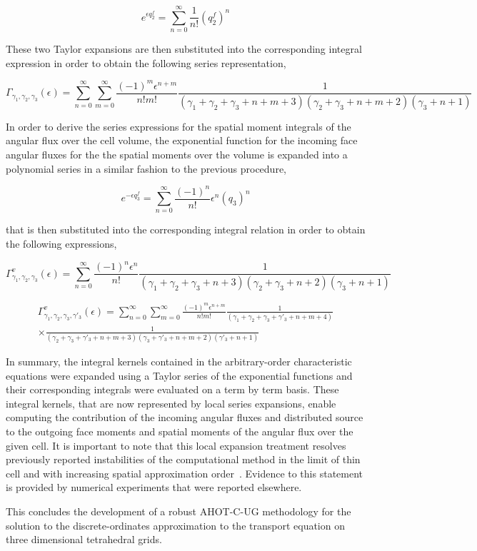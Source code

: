 \begin{equation}
    e^{\epsilon q_2^f} = \sum_{n=0}^{\infty} \frac{1}{n!} \left( q_2^f \right) ^n
\end{equation}

\noindent These two Taylor expansions are then substituted into the corresponding integral expression in order to obtain the following series representation,

\begin{equation}
    \Gamma_{\gamma_1 ,\gamma_2 ,\gamma_3} ( \epsilon ) = \sum_{n=0}^{\infty} \sum_{m=0}^{\infty} \frac{(-1)^m \epsilon^{n+m}}{n! m!}
    \frac{1}{( \gamma_1 + \gamma_2 + \gamma_3 +n+m+3) ( \gamma_2 + \gamma_3 +n+m+2) (\gamma_3 +n+1)}
\end{equation}

In order to derive the series expressions for the spatial moment integrals of the angular flux over the cell volume, the exponential function for the incoming face angular fluxes for the the spatial moments over the volume is expanded into a polynomial series in a similar fashion to the previous procedure,

\begin{equation}
    e^{- \epsilon q^f_3} = \sum_{n=0}^{\infty} \frac{(-1)^n}{n!} \epsilon^n \left( q_3 \right) ^n
\end{equation}

\noindent that is then substituted into the corresponding integral relation in order to obtain the following expressions,

\begin{equation}
    \Gamma^v_{\gamma_1 ,\gamma_2 ,\gamma_3} ( \epsilon ) = \sum_{n=0}^{\infty} \frac{(-1)^n \epsilon^{n}}{n!}
    \frac{1}{( \gamma_1 + \gamma_2 + \gamma_3 +n+3) ( \gamma_2 + \gamma_3 +n+2) (\gamma_3 +n+1)}
\end{equation}

\begin{multline}
    \Gamma^v_{\gamma_1 ,\gamma_2 ,\gamma_3 ,\gamma'_3} ( \epsilon ) = \sum_{n=0}^{\infty} \sum_{m=0}^{\infty} \frac{(-1)^m \epsilon^{n+m}}{n! m!} \frac{1}{( \gamma_1 + \gamma_2 + \gamma_3 + \gamma'_3 +n+m+4)}\\
    \times\frac{1}{( \gamma_2 + \gamma_3 + \gamma'_3 +n+m+3) ( \gamma_3 + \gamma'_3 +n+m+2) ( \gamma'_3 +n+1)}
\end{multline}

In summary, the integral kernels contained in the arbitrary-order characteristic equations were expanded using a Taylor series of the exponential functions and their corresponding integrals were evaluated on a term by term basis.
These integral kernels, that are now represented by local series expansions, enable computing the contribution of the incoming angular fluxes and distributed source to the outgoing face moments and spatial moments of the angular flux over the given cell.
It is important to note that this local expansion treatment resolves previously reported instabilities of the computational method in the limit of thin cell and with increasing spatial approximation order~\cite{Azmy2001}.
Evidence to this statement is provided by numerical experiments that were reported elsewhere.

This concludes the development of a robust \ac{AHOT-C-UG} methodology for the solution to the discrete-ordinates approximation to the transport equation
on three dimensional tetrahedral grids.